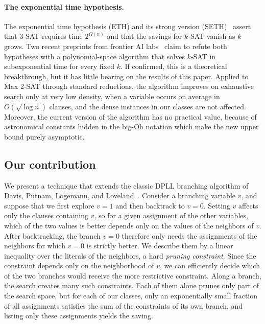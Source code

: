 \documentclass[11pt,a4paper]{article}
\theoremstyle{definition}
\theoremstyle{remark}
\begin{document}
\paragraph{The exponential time hypothesis.}
The exponential time hypothesis (ETH) and its strong version
(SETH)~\cite{impagliazzo2001problems,SETH} assert that 3-SAT requires time
$2^{\Omega(n)}$ and that the savings for $k$-SAT vanish as $k$ grows. Two
recent preprints from frontier AI labs~\cite{Anthropic26ETH,OpenAI26ETH} claim to refute
both hypotheses with a polynomial-space algorithm that solves $k$-SAT in
subexponential time for every fixed $k$. If confirmed, this is a theoretical
breakthrough, but it has little bearing on the results of this paper.
Applied to Max 2-SAT through standard reductions, the algorithm improves on
exhaustive search only at very low density, when a variable occurs on
average in $O(\sqrt{\log n})$ clauses, and the dense instances in our
classes are not affected. Moreover, the current version of the
algorithm has no practical value, because of astronomical constants hidden in the big-Oh notation which make the new upper bound purely asymptotic.


\subsection{Our contribution}
We present a technique that extends the classic DPLL branching algorithm of Davis, Putnam, Logemann, and Loveland~\cite{davis1962machine,davis1960computing}. Consider a branching variable $v$, and suppose that we first explore $v=1$ and then backtrack to $v=0$. Setting $v$ affects only the clauses containing $v$, so for a given assignment of the other variables, which of the two values is better depends only on the values of the neighbors of $v$. After backtracking, the branch $v=0$ therefore only needs the assignments of the neighbors for which $v=0$ is strictly better. We describe them by a linear inequality over the literals of the neighbors, a hard \emph{pruning constraint}. Since the constraint depends only on the neighborhood of $v$, we can efficiently decide which of the two branches would receive the more restrictive constraint. Along a branch, the search creates many such constraints. Each of them alone prunes only part of the search space, but for each of our classes, only an exponentially small fraction of all assignments satisfies the sum of the constraints of its own branch, and listing only these assignments yields the saving.
\end{document}
